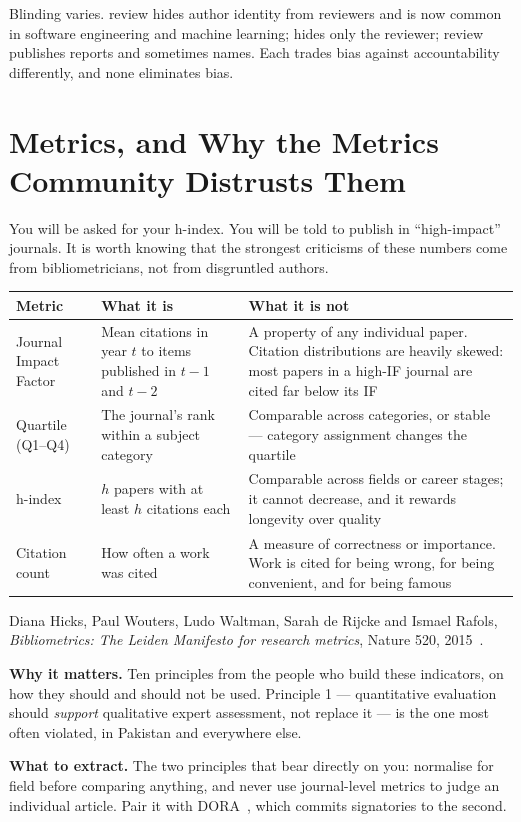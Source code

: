 Blinding varies.  review hides author identity from
reviewers and is now common in software engineering and machine learning;
 hides only the reviewer;  review publishes
reports and sometimes names. Each trades bias against accountability
differently, and none eliminates bias.

\section{Metrics, and Why the Metrics Community Distrusts Them}

You will be asked for your h-index. You will be told to publish in
``high-impact'' journals. It is worth knowing that the strongest criticisms of
these numbers come from bibliometricians, not from disgruntled authors.

\begin{center}
\small
\begin{tabular}{@{}L{2.9cm}L{4.6cm}L{6.9cm}@{}}
\toprule
\textbf{Metric} & \textbf{What it is} & \textbf{What it is not} \\
\midrule
Journal Impact Factor
  & Mean citations in year $t$ to items published in $t{-}1$ and $t{-}2$
  & A property of any individual paper. Citation distributions are heavily
    skewed: most papers in a high-IF journal are cited far below its IF \\
Quartile (Q1--Q4)
  & The journal's rank within a subject category
  & Comparable across categories, or stable --- category assignment changes
    the quartile \\
h-index
  & $h$ papers with at least $h$ citations each
  & Comparable across fields or career stages; it cannot decrease, and it
    rewards longevity over quality \\
Citation count
  & How often a work was cited
  & A measure of correctness or importance. Work is cited for being wrong,
    for being convenient, and for being famous \\
\bottomrule
\end{tabular}
\end{center}

\begin{paperbox}
Diana Hicks, Paul Wouters, Ludo Waltman, Sarah de Rijcke and Ismael Rafols,
\emph{Bibliometrics: The Leiden Manifesto for research metrics}, Nature 520,
2015~\cite{hicks2015leiden}.\oa{}

\medskip
\textbf{Why it matters.} Ten principles from the people who build these
indicators, on how they should and should not be used. Principle 1 ---
quantitative evaluation should \emph{support} qualitative expert assessment,
not replace it --- is the one most often violated, in Pakistan and everywhere
else.

\medskip
\textbf{What to extract.} The two principles that bear directly on you:
normalise for field before comparing anything, and never use journal-level
metrics to judge an individual article. Pair it with
DORA~\cite{dora2013declaration}, which commits signatories to the second.
\end{paperbox}

